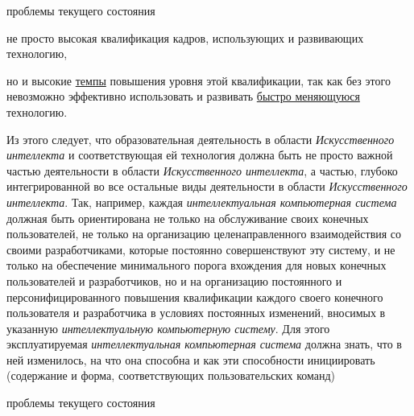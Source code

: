 \begin{scnsubstruct}
\begin{scnrelfromset}{проблемы текущего состояния}
{\begin{scnitemize}
                \item не просто высокая квалификация кадров, использующих и развивающих технологию,
                \item но и высокие \uline{темпы} повышения уровня этой квалификации, так как без этого невозможно эффективно использовать и развивать \uline{быстро меняющуюся} технологию.
            \end{scnitemize}
            \bigskip Из этого следует, что образовательная деятельность в области \textit{Искусственного интеллекта} и соответствующая ей технология должна быть не просто важной частью деятельности в области \textit{Искусственного интеллекта}, а частью, глубоко интегрированной во все остальные виды деятельности в области \textit{Искусственного интеллекта}. Так, например, каждая \textit{интеллектуальная компьютерная система} должная быть ориентирована не только на обслуживание своих конечных пользователей, не только на организацию целенаправленного взаимодействия со своими разработчиками, которые постоянно совершенствуют эту систему, и не только на обеспечение минимального порога вхождения для новых конечных пользователей и разработчиков, но и на организацию постоянного и персонифицированного повышения квалификации каждого своего конечного пользователя и разработчика в условиях постоянных изменений, вносимых в указанную \textit{интеллектуальную компьютерную систему}. Для этого эксплуатируемая \textit{интеллектуальная компьютерная система} должна знать, что в ней изменилось, на что она способна и как эти способности инициировать (содержание и форма, соответствующих пользовательских команд)}
    \end{scnrelfromset}
    \bigskip{}
    \begin{scnrelfromset}{проблемы текущего состояния}

\end{scnrelfromset}
\end{scnsubstruct}

